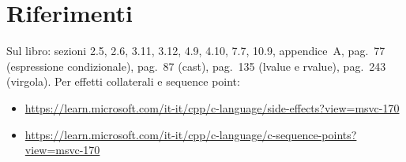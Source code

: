 \documentclass[11pt,a4paper]{article}
\begin{document}
\section{Riferimenti}

Sul libro: sezioni 2.5, 2.6, 3.11, 3.12, 4.9, 4.10, 7.7, 10.9, appendice~A, pag.~77 (espressione condizionale), pag.~87 (cast), pag.~135 (lvalue e rvalue), pag.~243 (virgola). Per effetti collaterali e sequence point:
\begin{itemize}
    \item {\footnotesize\url{https://learn.microsoft.com/it-it/cpp/c-language/side-effects?view=msvc-170}}
    \item {\footnotesize\url{https://learn.microsoft.com/it-it/cpp/c-language/c-sequence-points?view=msvc-170}}
\end{itemize}
\end{document}

